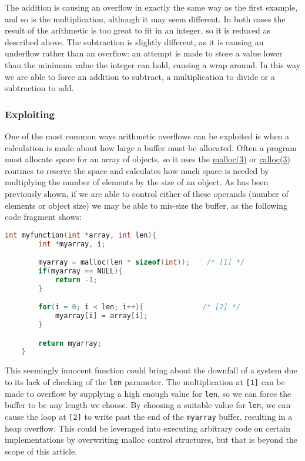 \documentclass{iacrtrans}
\begin{document}
The addition is causing an overflow in exactly the same way as the first
example, and so is the multiplication, although it may seem different.  In
both cases the result of the arithmetic is too great to fit in an integer,
so it is reduced as described above.  The subtraction is slightly
different, as it is causing an underflow rather than an overflow: an
attempt is made to store a value lower than the minimum value the integer
can hold, causing a wrap around.  In this way we are able to force an
addition to subtract, a multiplication to divide or a subtraction to add.

\subsubsection{Exploiting}

One of the most common ways arithmetic overflows can be exploited is when a
calculation is made about how large a buffer must be allocated.  Often a
program must allocate space for an array of objects, so it uses the
\href{https://man7.org/linux/man-pages/man3/malloc.3.html}{malloc(3)} or \href{https://man7.org/linux/man-pages/man3/calloc.3.html}{calloc(3)} routines to reserve the space and calculates how
much space is needed by multiplying the number of elements by the size of
an object.  As has been previously shown, if we are able to control either
of these operands (number of elements or object size) we may be able to
mis-size the buffer, as the following code fragment shows:

\begin{lstlisting}[language=c]
    int myfunction(int *array, int len){
        int *myarray, i;

        myarray = malloc(len * sizeof(int));    /* [1] */
        if(myarray == NULL){
            return -1;
        }

        for(i = 0; i < len; i++){              /* [2] */
            myarray[i] = array[i];
        }

        return myarray;
    }
\end{lstlisting}

This seemingly innocent function could bring about the downfall of a system
due to its lack of checking of the \texttt{len} parameter.  The multiplication at
\texttt{[1]} can be made to overflow by supplying a high enough value for \texttt{len}, so we
can force the buffer to be any length we choose.  By choosing a suitable
value for \texttt{len}, we can cause the loop at \texttt{[2]} to write past the end of the
\texttt{myarray} buffer, resulting in a heap overflow.  This could be leveraged into
executing arbitrary code on certain implementations by overwriting malloc
control structures, but that is beyond the scope of this article.
\end{document}
